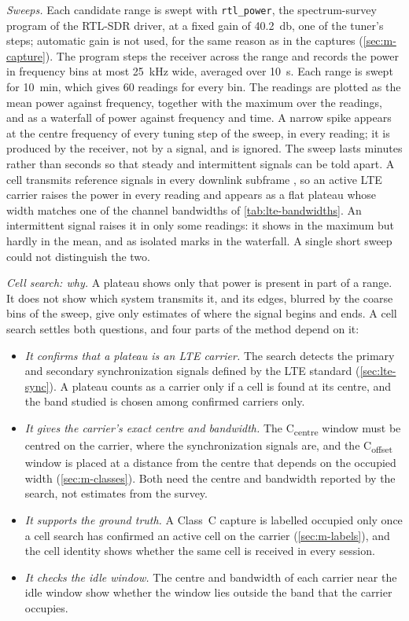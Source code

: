 \emph{Sweeps.} Each candidate range is swept with \texttt{rtl\_power}, the spectrum-survey program of the RTL-SDR driver, at a fixed gain of \qty{40.2}{\decibel}, one of the tuner's steps; automatic gain is not used, for the same reason as in the captures (\cref{sec:m-capture}). The program steps the receiver across the range and records the power in frequency bins at most \qty{25}{\kilo\hertz} wide, averaged over \qty{10}{\second}. Each range is swept for \qty{10}{\minute}, which gives 60 readings for every bin. The readings are plotted as the mean power against frequency, together with the maximum over the readings, and as a waterfall of power against frequency and time. A narrow spike appears at the centre frequency of every tuning step of the sweep, in every reading; it is produced by the receiver, not by a signal, and is ignored. The sweep lasts minutes rather than seconds so that steady and intermittent signals can be told apart. A cell transmits reference signals in every downlink subframe \parencite[clause~6.10.1]{3gpp2026a}, so an active LTE carrier raises the power in every reading and appears as a flat plateau whose width matches one of the channel bandwidths of \cref{tab:lte-bandwidths}. An intermittent signal raises it in only some readings: it shows in the maximum but hardly in the mean, and as isolated marks in the waterfall. A single short sweep could not distinguish the two.

\emph{Cell search: why.} A plateau shows only that power is present in part of a range. It does not show which system transmits it, and its edges, blurred by the coarse bins of the sweep, give only estimates of where the signal begins and ends. A cell search settles both questions, and four parts of the method depend on it:
\begin{itemize}
  \item \emph{It confirms that a plateau is an LTE carrier.} The search detects the primary and secondary synchronization signals defined by the LTE standard \parencite[clause~6.11]{3gpp2026a} (\cref{sec:lte-sync}). A plateau counts as a carrier only if a cell is found at its centre, and the band studied is chosen among confirmed carriers only.
  \item \emph{It gives the carrier's exact centre and bandwidth.} The C\textsubscript{centre} window must be centred on the carrier, where the synchronization signals are, and the C\textsubscript{offset} window is placed at a distance from the centre that depends on the occupied width (\cref{sec:m-classes}). Both need the centre and bandwidth reported by the search, not estimates from the survey.
  \item \emph{It supports the ground truth.} A Class~C capture is labelled occupied only once a cell search has confirmed an active cell on the carrier (\cref{sec:m-labels}), and the cell identity shows whether the same cell is received in every session.
  \item \emph{It checks the idle window.} The centre and bandwidth of each carrier near the idle window show whether the window lies outside the band that the carrier occupies.
\end{itemize}


